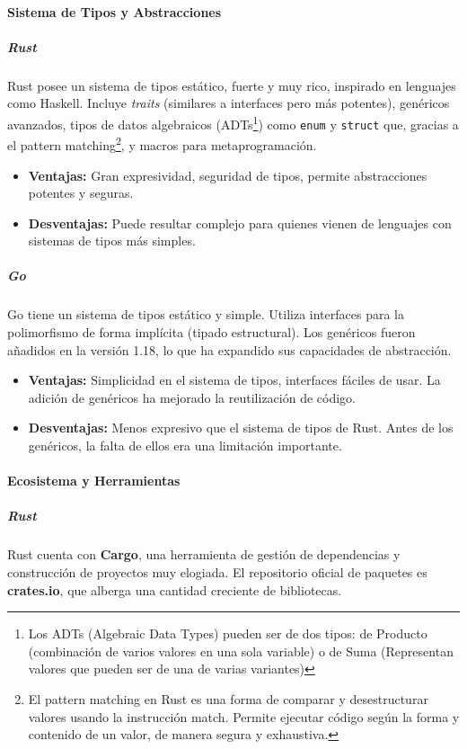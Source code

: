 \paragraph{Sistema de Tipos y Abstracciones}
\subparagraph{Rust}
Rust posee un sistema de tipos estático, fuerte y muy rico, inspirado en lenguajes como Haskell. Incluye \textit{traits} (similares a interfaces pero más potentes), genéricos avanzados, tipos de datos algebraicos (ADTs\footnote{Los ADTs (Algebraic Data Types) pueden ser de dos tipos: de Producto (combinación de varios valores en una sola variable) o de Suma (Representan valores que pueden ser de una de varias variantes)}) como \texttt{enum} y \texttt{struct} que, gracias a el pattern matching\footnote{El pattern matching en Rust es una forma de comparar y desestructurar valores usando la instrucción match. Permite ejecutar código según la forma y contenido de un valor, de manera segura y exhaustiva.}, y macros para metaprogramación.
\begin{itemize}
    \item \textbf{Ventajas:} Gran expresividad, seguridad de tipos, permite abstracciones potentes y seguras.
    \item \textbf{Desventajas:} Puede resultar complejo para quienes vienen de lenguajes con sistemas de tipos más simples.
\end{itemize}

\subparagraph{Go}
Go tiene un sistema de tipos estático y simple. Utiliza interfaces para la polimorfismo de forma implícita (tipado estructural). Los genéricos fueron añadidos en la versión 1.18, lo que ha expandido sus capacidades de abstracción.
\begin{itemize}
    \item \textbf{Ventajas:} Simplicidad en el sistema de tipos, interfaces fáciles de usar. La adición de genéricos ha mejorado la reutilización de código.
    \item \textbf{Desventajas:} Menos expresivo que el sistema de tipos de Rust. Antes de los genéricos, la falta de ellos era una limitación importante.
\end{itemize}

\paragraph{Ecosistema y Herramientas}
\subparagraph{Rust}
Rust cuenta con \textbf{Cargo}, una herramienta de gestión de dependencias y construcción de proyectos muy elogiada. El repositorio oficial de paquetes es \textbf{crates.io}, que alberga una cantidad creciente de bibliotecas.

